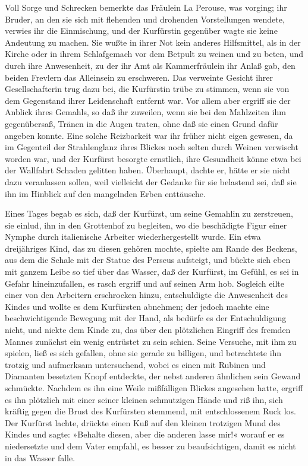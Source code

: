 Voll Sorge und Schrecken bemerkte das Fräulein La Perouse, was
vorging; ihr Bruder, an den sie sich mit flehenden und drohenden
Vorstellungen wendete, verwies ihr die Einmischung, und der
Kurfürstin gegenüber wagte sie keine Andeutung zu machen. Sie wußte
in ihrer Not kein anderes Hilfsmittel, als in der Kirche oder in
ihrem\pagenum{[117]} Schlafgemach vor dem Betpult zu weinen und zu
beten, und durch ihre Anwesenheit, zu der ihr Amt als
Kammerfräulein ihr Anlaß gab, den beiden Frevlern das Alleinsein zu
erschweren. Das verweinte Gesicht ihrer Gesellschafterin trug dazu
bei, die Kurfürstin trübe zu stimmen, wenn sie von dem Gegenstand
ihrer Leidenschaft entfernt war. Vor allem aber ergriff sie der
Anblick ihres Gemahls, so daß ihr zuweilen, wenn sie bei den
Mahlzeiten ihm gegenübersaß, Tränen in die Augen traten, ohne daß
sie einen Grund dafür angeben konnte. Eine solche Reizbarkeit war
ihr früher nicht eigen gewesen, da im Gegenteil der Strahlenglanz
ihres Blickes noch selten durch Weinen verwischt worden war, und
der Kurfürst besorgte ernstlich, ihre Gesundheit könne etwa bei der
Wallfahrt Schaden gelitten haben. Überhaupt, dachte er, hätte er
sie nicht dazu veranlassen sollen, weil vielleicht der Gedanke für
sie belastend sei, daß sie ihn im Hinblick auf den mangelnden Erben
enttäusche.

Eines Tages begab es sich, daß der Kurfürst, um seine Gemahlin zu
zerstreuen, sie einlud, ihn in den Grottenhof zu begleiten, wo die
beschädigte Figur einer Nymphe durch italienische Arbeiter
wiederhergestellt wurde. Ein etwa dreijähriges Kind, das zu diesen
gehören mochte, spielte am Rande des Beckens, aus dem die Schale
mit der Statue des Perseus aufsteigt, und bückte sich eben mit
ganzem Leibe so tief über das Wasser, daß der Kurfürst, im Gefühl,
es sei in Gefahr hineinzufallen, es rasch ergriff und auf seinen
Arm hob. Sogleich eilte einer von den Arbeitern erschrocken hinzu,
entschuldigte die Anwesenheit des Kindes und wollte es dem
Kurfürsten abnehmen; der jedoch machte eine beschwichtigende
Bewegung mit der Hand, als bedürfe es der\pagenum{[118]}
Entschuldigung nicht, und nickte dem Kinde zu, das über den
plötzlichen Eingriff des fremden Mannes zunächst ein wenig
entrüstet zu sein schien. Seine Versuche, mit ihm zu spielen, ließ
es sich gefallen, ohne sie gerade zu billigen, und betrachtete ihn
trotzig und aufmerksam untersuchend, wobei es einen mit Rubinen und
Diamanten besetzten Knopf entdeckte, der nebst anderen ähnlichen
sein Gewand schmückte. Nachdem es ihn eine Weile mißfälligen
Blickes angesehen hatte, ergriff es ihn plötzlich mit einer seiner
kleinen schmutzigen Hände und riß ihn, sich kräftig gegen die Brust
des Kurfürsten stemmend, mit entschlossenem Ruck los. Der Kurfürst
lachte, drückte einen Kuß auf den kleinen trotzigen Mund des Kindes
und sagte: »Behalte diesen, aber die anderen lasse mir!« worauf er
es niedersetzte und dem Vater empfahl, es besser zu beaufsichtigen,
damit es nicht in das Wasser falle.

